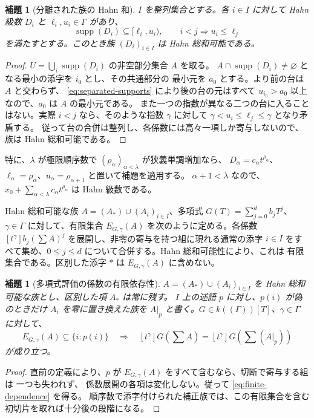\documentclass[11pt,uplatex,dvipdfmx]{jsarticle}
\newcommand{\Supp}{\operatorname{supp}}
\theoremstyle{proofnote}
\newtheorem{lemma}[theorem]{補題}
\begin{document}
\begin{lemma}[分離された族の Hahn 和]
\label{lem:ordinal-hahn-sum}
  \(I\) を整列集合とする。各 \(i\in I\) に対して Hahn 級数 \(D_i\) と
  \(\ell_i,u_i\in\Gamma\) があり、
  \[
    \Supp(D_i)\subseteq[\ell_i,u_i),
    \qquad i<j\Longrightarrow u_i\le\ell_j
    \tag{SS}\label{eq:separated-supports}
  \]
  を満たすとする。このとき族 \((D_i)_{i\in I}\) は Hahn 総和可能である。
\end{lemma}
\begin{proof}
  \(U=\bigcup_i\Supp(D_i)\) の非空部分集合 \(A\) を取る。
  \(A\cap\Supp(D_i)\ne\varnothing\) となる最小の添字を \(i_0\) とし、その共通部分の
  最小元を \(a_0\) とする。より前の台は \(A\) と交わらず、
  \eqref{eq:separated-supports} により後の台の元はすべて
  \(u_{i_0}>a_0\) 以上なので、\(a_0\) は \(A\) の最小元である。
  また一つの指数が異なる二つの台に入ることはない。実際 \(i<j\) なら、そのような指数
  \(\gamma\) に対して \(\gamma<u_i\le\ell_j\le\gamma\) となり矛盾する。
  従って台の合併は整列し、各係数には高々一項しか寄与しないので、族は Hahn 総和可能である。
\end{proof}

特に、\(\lambda\) が極限順序数で \((\rho_\alpha)_{\alpha<\lambda}\) が狭義単調増加なら、
\(D_\alpha=c_\alpha t^{\rho_\alpha}\)、
\(\ell_\alpha=\rho_\alpha\)、\(u_\alpha=\rho_{\alpha+1}\) と置いて補題を適用する。
\(\alpha+1<\lambda\) なので、
\(x_0+\sum_{\alpha<\lambda}c_\alpha t^{\rho_\alpha}\) は Hahn 級数である。

Hahn 総和可能な族 \(A=(A_*)\cup(A_i)_{i\in I}\)、多項式
\(G(T)=\sum_{j=0}^d b_jT^j\)、\(\gamma\in\Gamma\) に対して、有限集合
\(E_{G,\gamma}(A)\) を次のように定める。各係数
\([t^\gamma]b_j(\sum A)^j\) を展開し、非零の寄与を持つ組に現れる通常の添字
\(i\in I\) をすべて集め、\(0\le j\le d\) について合併する。Hahn 総和可能性により、これは
有限集合である。区別した添字 \(*\) は \(E_{G,\gamma}(A)\) に含めない。

\begin{lemma}[多項式評価の係数の有限依存性]
\label{lem:ordinal-eval-finite}
  \(A=(A_*)\cup(A_i)_{i\in I}\) を Hahn 総和可能な族とし、区別した項 \(A_*\) は常に残す。
  \(I\) 上の述語 \(p\) に対し、\(p(i)\) が偽のときだけ \(A_i\) を零に置き換えた族を
  \(A|_p\) と書く。\(G\in k((\Gamma))[T]\)、\(\gamma\in\Gamma\) に対して、
  \[
    E_{G,\gamma}(A)\subseteq\{i:p(i)\}
    \quad\Longrightarrow\quad
    [t^\gamma]G\!\left(\sum A\right)
      =[t^\gamma]G\!\left(\sum(A|_p)\right)
    \tag{FD}\label{eq:finite-dependence}
  \]
  が成り立つ。
\end{lemma}
\begin{proof}
  直前の定義により、\(p\) が \(E_{G,\gamma}(A)\) をすべて含むなら、切断で寄与する組は
  一つも失われず、
  係数展開の各項は変化しない。従って \eqref{eq:finite-dependence} を得る。
  順序数で添字付けられた補正族では、この有限集合を含む初切片を取れば十分後の段階になる。
\end{proof}
\end{document}

